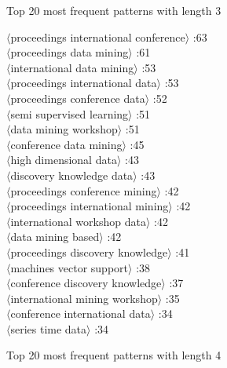 \documentclass[11pt,a4paper,fleqn]{article}
\begin{document}
Top 20 most frequent patterns with length 3
\begin{multicols}{2} \noindent
$\langle$proceedings international conference$\rangle$ :63\\
$\langle$proceedings data mining$\rangle$ :61\\
$\langle$international data mining$\rangle$ :53\\
$\langle$proceedings international data$\rangle$ :53\\
$\langle$proceedings conference data$\rangle$ :52\\
$\langle$semi supervised learning$\rangle$ :51\\
$\langle$data mining workshop$\rangle$ :51\\
$\langle$conference data mining$\rangle$ :45\\
$\langle$high dimensional data$\rangle$ :43\\
$\langle$discovery knowledge data$\rangle$ :43\\
$\langle$proceedings conference mining$\rangle$ :42\\
$\langle$proceedings international mining$\rangle$ :42\\
$\langle$international workshop data$\rangle$ :42\\
$\langle$data mining based$\rangle$ :42\\
$\langle$proceedings discovery knowledge$\rangle$ :41\\
$\langle$machines vector support$\rangle$ :38\\
$\langle$conference discovery knowledge$\rangle$ :37\\
$\langle$international mining workshop$\rangle$ :35\\
$\langle$conference international data$\rangle$ :34\\
$\langle$series time data$\rangle$ :34\\
\end{multicols} \noindent
Top 20 most frequent patterns with length 4
\end{document}
